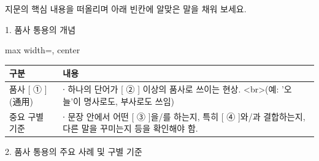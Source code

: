 \documentclass[fs9,seriesRus]{korfarm-base}
\begin{document}
\kfActivityBg \par{}지문의 핵심 내용을 떠올리며 아래 빈칸에 알맞은 말을 채워 보세요.

1. 품사 통용의 개념 

\par\medskip{}
\noindent\begin{adjustbox}{max width=\linewidth, center}
\renewcommand{\arraystretch}{1.45}
\begin{tabular}{|>{\raggedright\arraybackslash}p{}|>{\raggedright\arraybackslash}p{}|}
\hline
\rowcolor{kfPrimaryLight!50}\textbf{\color{kfPrimary} 구분} & \textbf{\color{kfPrimary} 내용} \\\hline
품사 [ ① ] (通用) & ∙ 하나의 단어가 [ ② ] 이상의 품사로 쓰이는 현상. <br>(예: '오늘'이 명사로도, 부사로도 쓰임) \\\hline
중요 구별 기준 & ∙ 문장 안에서 어떤 [ ③ ]을/를 하는지, 특히 [ ④ ]와/과 결합하는지, 다른 말을 꾸미는지 등을 확인해야 함. \\\hline
\end{tabular}
\end{adjustbox}\par\medskip



2. 품사 통용의 주요 사례 및 구별 기준 
\end{document}
